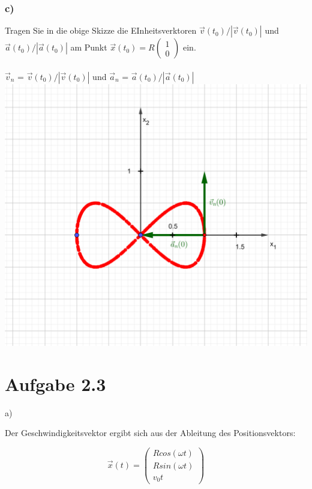 \documentclass{theozettel}
\begin{document}
	\subsubsection*{c)}Tragen Sie in die obige Skizze die EInheitsverktoren $\vec{v}\left(t_0\right)/|\vec{v}\left(t_0\right)|$ und $\vec{a}\left(t_0\right)/|\vec{a}\left(t_0\right)|$ am Punkt $\vec{x}\left(t_0\right) = R \left(\begin{smallmatrix}1\\0\end{smallmatrix}\right)$ ein.\\\\
	$\vec{v}_n$ = $\vec{v}\left(t_0\right)/|\vec{v}\left(t_0\right)|$ und  $\vec{a}_n$ = $\vec{a}\left(t_0\right)/|\vec{a}\left(t_0\right)|$\\
	\includegraphics[scale=2.4]{A2-2c.png}


\newpage
\section*{Aufgabe 2.3}

a)

Der Geschwindigkeitsvektor ergibt sich aus der Ableitung des Positionsvektors:

$$
\vec{x}(t) = \begin{pmatrix}
R cos(\omega t) \\
R sin(\omega t) \\
v_0 t
\end{pmatrix}
$$
\end{document}
